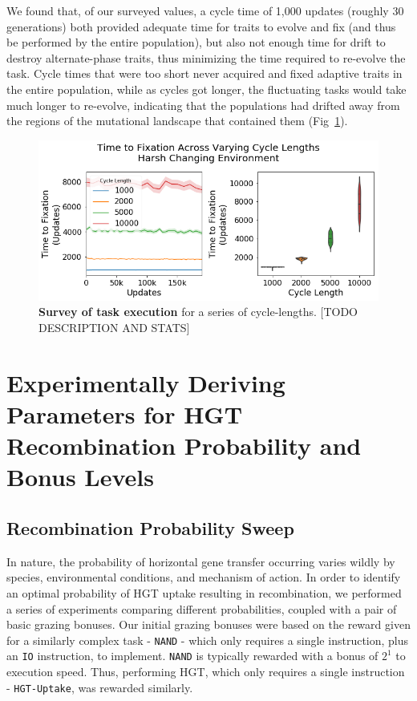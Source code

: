 \documentclass[PhD]{msu-thesis}
\begin{document}
\begin{appendices}
We found that, of our surveyed values, a cycle time of 1,000 updates (roughly 30 generations) both provided adequate time for traits to evolve and fix (and thus be performed by the entire population), but also not enough time for drift to destroy alternate-phase traits, thus minimizing the time required to re-evolve the task. Cycle times that were too short never acquired and fixed adaptive traits in the entire population, while as cycles got longer, the fluctuating tasks would take much longer to re-evolve, indicating that the populations had drifted away from the regions of the mutational landscape that contained them (Fig~\ref{fig:a1-timetofixation}). 

	\begin{figure}[!h]

	\includegraphics[trim={0 0 0 0}, clip, width=0.85\columnwidth]{figures/A1/a1-timetofixation-harsh.png}
	\caption{\textbf{Survey of task execution} for a series of cycle-lengths. [TODO DESCRIPTION AND STATS]%
	}
	\label{fig:a1-timetofixation}
	\end{figure}

\chapter{Experimentally Deriving Parameters for HGT Recombination Probability and Bonus Levels}
\label{appendix:hgt_sweep}

\section{Recombination Probability Sweep}
In nature, the probability of horizontal gene transfer occurring varies wildly by species, environmental conditions, and mechanism of action. In order to identify an optimal probability of HGT uptake resulting in recombination, we performed a series of experiments comparing different probabilities, coupled with a pair of basic grazing bonuses. Our initial grazing bonuses were based on the reward given for a similarly complex task - \texttt{NAND} - which only requires a single instruction, plus an \texttt{IO} instruction, to implement. \texttt{NAND} is typically rewarded with a bonus of $2^1$ to execution speed. Thus, performing HGT, which only requires a single instruction - \texttt{HGT-Uptake}, was rewarded similarly.


\end{appendices}
\end{document}
